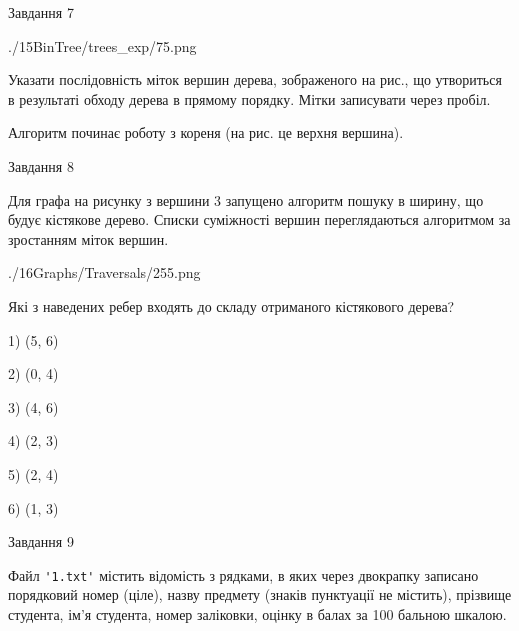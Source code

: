\documentclass[12pt, ukrainian]{article}
\def\code#1{\Verb!#1!}
\begin{document}
{\vspace{10mm}\par

\newpage
\begin{minipage}[t]{9.7cm}
               
{\begin{center}Завдання {7}\end{center}}
\vspace{-6mm}

\begin{center}
	{./15BinTree/trees_exp/75.png}
\end{center}
Указати послідовність міток вершин дерева, зображеного на рис., що утвориться в результаті обходу дерева в прямому порядку. Мітки записувати через пробіл.\par Алгоритм починає роботу з кореня (на рис. це верхня вершина).\par

\end{minipage}
\vline \hspace{8mm}
\begin{minipage}[t]{8.0cm}
               
{\begin{center}Завдання {8}\end{center}}
\vspace{-6mm}
Для графа на рисунку з вершини 3 запущено алгоритм пошуку в ширину, що будує кістякове дерево. Списки суміжності вершин переглядаються алгоритмом за зростанням міток вершин.\par
\begin{center}
	{./16Graphs/Traversals/255.png}
\end{center}
\par Які з наведених ребер входять до складу отриманого кістякового дерева?\par
1) (5, 6)\par
2) (0, 4)\par
3) (4, 6)\par
4) (2, 3)\par
5) (2, 4)\par
6) (1, 3)\par
{\vskip 15pt} \par

\end{minipage}

               
{\begin{center}Завдання {9}\end{center}}
\vspace{-6mm}
Файл \code{'1.txt'} містить відомість з рядками, в яких через двокрапку записано поряд\-ковий номер (ціле), назву предмету (знаків пунктуації не містить), прізвище студента, ім'я студента, номер заліковки, оцінку в балах за 100 бальною шкалою.

}
\end{document}
